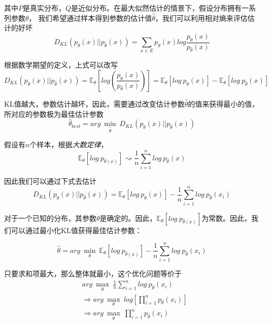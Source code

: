 其中$P$是真实分布，$Q$是近似分布。在最大似然估计的情景下，假设分布拥有一系列参数$\theta$，
我们希望通过样本得到参数的估计值$\hat{\theta}$，我们可以利用相对熵来评估估计的好坏
\begin{equation}
    D_{KL}(p_\theta(x)||p_{\hat{\theta}}(x))=\sum_{x\in E}p_\theta(x)log \frac{p_\theta(x)}{p_{\hat{\theta}}(x)}
\end{equation}

根据数学期望的定义，上式可以改写
\begin{equation}
    D_{KL}(p_\theta(x)||p_{\hat{\theta}}(x))=\mathbb{E}_\theta[log(\frac{p_\theta(x)}{p_{\hat{\theta}}(x)})]
    =\mathbb{E}_\theta[log\ p_\theta(x)]-\mathbb{E}_\theta[log\ p_{\hat{\theta}}(x)]
\end{equation}

KL值越大，参数估计越坏，因此，需要通过改变估计参数$\hat{\theta}$的值来获得最小的值，所对应的参数极为最佳估计参数
\begin{equation}
    \hat{\theta}_{best}=arg\ \min\limits_{\hat{\theta}}\ D_{KL}(p_\theta(x)||p_{\hat{\theta}}(x))
\end{equation}

假设有$n$个样本，根据\textsl{大数定律}，
\begin{equation}
    \mathbb{E}_{\theta}[log\ p_{\hat{\theta}(x)}]\rightsquigarrow \frac{1}{n}\sum\limits_{i=1}^{n}log\ p_{\hat{\theta}}(x)
\end{equation}

因此我们可以通过下式去估计
\begin{equation}
    D_{KL}(p_{\theta}(x)||p_{\hat{\theta}}(x))=\mathbb{E}_{\theta}[log\ p_{\theta}(x)]-\frac{1}{n}\sum\limits_{i=1}^{n}log\ p_{\hat{\theta}}(x_i)
\end{equation}

对于一个已知的分布，其参数$\theta$是确定的。因此，$\mathbb{E}_{\theta}[log\ p_{\hat{\theta}(x)}]$为常数。因此，我们可以通过最小化KL值获得最佳估计参数：

\begin{equation}
    \hat{\theta}=arg\ \min\limits_{\theta}\ \mathbb{E}_{\theta}[log\ p_{\hat{\theta}(x)}]-\frac{1}{n}\sum\limits_{i=1}^{n}log\ p_{\hat{\theta}}(x_i)
\end{equation}

只要求和项最大，那么整体就最小，这个优化问题等价于
\begin{equation}
    \begin{aligned}
        & arg\ \max\limits_{\theta}\ \frac{1}{n}\sum\limits_{i=1}^{n}log\ p_{\hat{\theta}}(x_i)\\
        & \Rightarrow arg\ \max\limits_{\theta}\ log[\prod\limits_{i=1}^{n}p_{\hat{\theta}}(x_i)]\\
        & \Rightarrow arg\ \max\limits_{\theta}\ \prod\limits_{i=1}^{n}p_{\hat{\theta}}(x_i)
    \end{aligned}
\end{equation}

